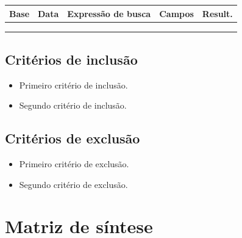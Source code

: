 \documentclass[12pt,a4paper]{article}
\begin{document}
\vspace{6pt}
{\footnotesize
\begin{tabularx}{\linewidth}{@{}p{2.1cm}p{1.8cm}Yp{2.0cm}p{1.1cm}@{}}
\toprule
\textbf{Base} & \textbf{Data} & \textbf{Expressão de busca} & \textbf{Campos} & \textbf{Result.} \\
\midrule
 & & & & \\[10pt]
\midrule
 & & & & \\[10pt]
\midrule
 & & & & \\[10pt]
\bottomrule
\end{tabularx}}

\vspace{12pt}
\subsection*{Critérios de inclusão}
\begin{itemize}
  \item Primeiro critério de inclusão.
  \item Segundo critério de inclusão.
\end{itemize}

\subsection*{Critérios de exclusão}
\begin{itemize}
  \item Primeiro critério de exclusão.
  \item Segundo critério de exclusão.
\end{itemize}

\newpage
\section{Matriz de síntese}
%
%
\end{document}
